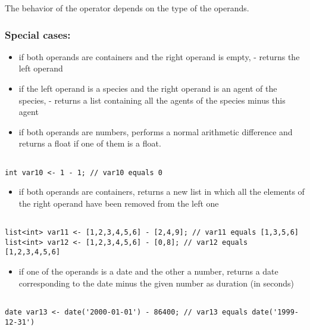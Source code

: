 \documentclass[]{book}
\providecommand{\tightlist}{%
  \setlength{\itemsep}{0pt}\setlength{\parskip}{0pt}}
\theoremstyle{definition}
\theoremstyle{definition}
\theoremstyle{definition}
\theoremstyle{remark}
\begin{document}
The behavior of the operator depends on the type of the operands.

\subsubsection{Special cases:}\label{special-cases}

\begin{itemize}
\tightlist
\item
  if both operands are containers and the right operand is empty, -
  returns the left operand\\
\item
  if the left operand is a species and the right operand is an agent of
  the species, - returns a list containing all the agents of the species
  minus this agent\\
\item
  if both operands are numbers, performs a normal arithmetic difference
  and returns a float if one of them is a float.
\end{itemize}

\begin{verbatim}
 
int var10 <- 1 - 1; // var10 equals 0
\end{verbatim}

\begin{itemize}
\tightlist
\item
  if both operands are containers, returns a new list in which all the
  elements of the right operand have been removed from the left one
\end{itemize}

\begin{verbatim}
 
list<int> var11 <- [1,2,3,4,5,6] - [2,4,9]; // var11 equals [1,3,5,6] 
list<int> var12 <- [1,2,3,4,5,6] - [0,8]; // var12 equals [1,2,3,4,5,6]
\end{verbatim}

\begin{itemize}
\tightlist
\item
  if one of the operands is a date and the other a number, returns a
  date corresponding to the date minus the given number as duration (in
  seconds)
\end{itemize}

\begin{verbatim}
 
date var13 <- date('2000-01-01') - 86400; // var13 equals date('1999-12-31')
\end{verbatim}
\end{document}

